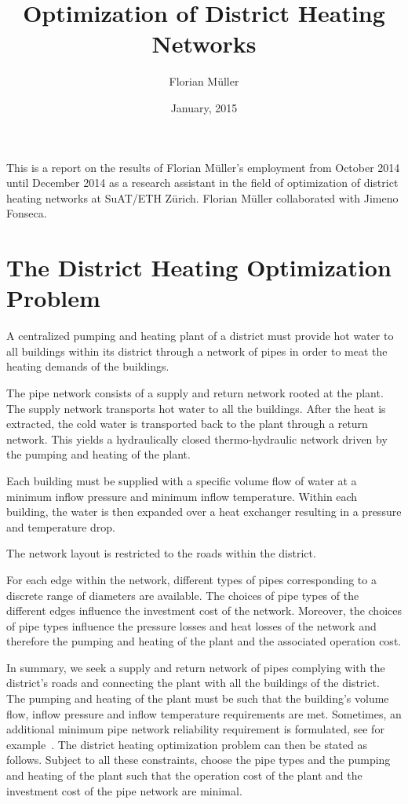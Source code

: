 \documentclass[a4paper,10pt]{article}
\title{Optimization of District Heating Networks}
\author{Florian M\"uller}
\date{January, 2015}
\begin{document}
\maketitle

This is a report on the results of Florian M\"uller's employment from October 2014 until December 2014 as a research assistant in the field of optimization of district heating networks at SuAT/ETH Z\"urich. 
Florian M\"uller collaborated with Jimeno Fonseca.

\tableofcontents

\section{The District Heating Optimization Problem}

A centralized pumping and heating plant of a district must provide hot water to all buildings within its district through a network of pipes in order to meat the heating demands of the buildings. 

The pipe network consists of a supply and return network rooted at the plant. 
The supply network transports hot water to all the buildings. 
After the heat is extracted, the cold water is transported back to the plant through a return network.
This yields a hydraulically closed thermo-hydraulic network driven by the pumping and heating of the plant.  

Each building must be supplied with a specific volume flow of water at a minimum inflow pressure and minimum inflow temperature. 
Within each building, the water is then expanded over a heat exchanger resulting in a pressure and temperature drop.

The network layout is restricted to the roads within the district.

For each edge within the network, different types of pipes corresponding to a discrete range of diameters are available. 
The choices of pipe types of the different edges influence the investment cost of the network. 
Moreover, the choices of pipe types influence the pressure losses and heat losses of the network and therefore the pumping and heating of the plant and the associated operation cost.

In summary, we seek a supply and return network of pipes complying with the district's roads and connecting the plant with all the buildings of the district. 
The pumping and heating of the plant must be such that the building's volume flow, inflow pressure and inflow temperature requirements are met. 
Sometimes, an additional minimum pipe network reliability requirement is formulated, see for example~\cite{Afshar}. 
The district heating optimization problem can then be stated as follows. 
Subject to all these constraints, choose the pipe types and the pumping and heating of the plant such that the operation cost of the plant and the investment cost of the pipe network are minimal.
\end{document}
